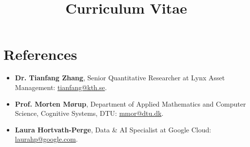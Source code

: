 \documentclass[11pt,a4paper]{moderncv}
\title{Curriculum Vitae}
\begin{document}
\makecvtitle

\section*{References}

\begin{itemize}
    \item \textbf{Dr. Tianfang Zhang},  Senior Quantitative Researcher at Lynx Asset Management: \href{mailto:tianfang@kth.se}{tianfang@kth.se}.
    \item \textbf{Prof. Morten Mørup}, Department of Applied Mathematics and Computer Science, Cognitive Systems, DTU: \href{mailto:mmor@dtu.dk}{mmor@dtu.dk}.
    \item \textbf{Laura Hortvath-Perge}, Data \& AI Specialist at Google Cloud: \href{mailto:laurahp@google.com}{laurahp@google.com}.
\end{itemize}
\end{document}
